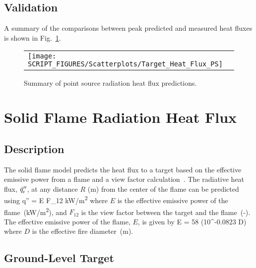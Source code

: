 

\clearpage


\subsection*{Validation}

A summary of the comparisons between peak predicted and measured heat fluxes is shown in Fig.~\ref{Heat_Flux_Point_Source_Summary}.

\begin{figure}[!ht]
\begin{center}
\begin{tabular}{l}
\texttt{[image: SCRIPT\_FIGURES/Scatterplots/Target\_Heat\_Flux\_PS]}
\end{tabular}
\end{center}
\caption[Summary of point source radiation heat flux predictions]
{Summary of point source radiation heat flux predictions.}
\label{Heat_Flux_Point_Source_Summary}
\end{figure}


\clearpage


\section{Solid Flame Radiation Heat Flux}

\subsection*{Description}

The solid flame model predicts the heat flux to a target based on the effective emissive power from a flame and a view factor calculation~\cite{Beyler2:SFPE}.
The radiative heat flux, $\dot q''\sb{r}$, at any distance $R$ (\si{m}) from the center of the flame can be predicted using
\be
\dot q'' = E F_{12} \quad \si{kW/m^2}
\label{eq:solid_flame}
\ee
where $E$ is the effective emissive power of the flame~(\si{kW/m^2}), and $F_{12}$ is the view factor between the target and the flame~(-).
The effective emissive power of the flame, $E$, is given by
\be
E = 58 (10^{-0.0823 D})
\label{eq:solid_flame_E}
\ee
where $D$ is the effective fire diameter~(\si{m}).

\subsection*{Ground-Level Target}

